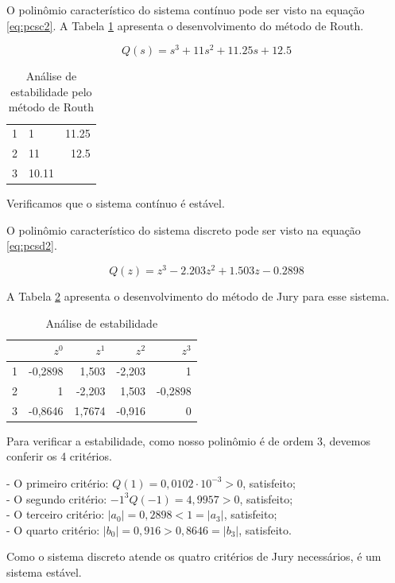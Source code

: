     O polinômio característico do sistema contínuo pode ser visto na equação \ref{eq:pcsc2}. A Tabela 
    \ref{tab:RE2} apresenta o desenvolvimento do método de Routh. 
    
    \begin{equation}
        Q(s) = s^3+11s^2+11.25s+12.5
        \label{eq:pcsc2}
    \end{equation}

    \begin{table}[!ht]
        \centering
        \vspace{0.5cm}
        \caption{Análise de estabilidade pelo método de Routh} 
        \begin{tabular}{r|lr}
            
            1 & 1 & 11.25 \\
            2 & 11 & 12.5 \\
            3 & 10.11\\
        \end{tabular}                
        \label{tab:RE2}
    \end{table}

    Verificamos que o sistema contínuo é estável.

    O polinômio característico do sistema discreto pode ser visto na equação \ref{eq:pcsd2}.

    \begin{equation}
        Q(z) = z^3 - 2.203 z^2 + 1.503 z - 0.2898
        \label{eq:pcsd2}
    \end{equation}

    A Tabela \ref{tab:JE2} apresenta o desenvolvimento do método de Jury para esse sistema.

    \begin{table}[!ht]
        \centering
        \caption{Análise de estabilidade} 
        \begin{tabular}{l| r r r r}
            & $z^0$ & $z^1$ & $z^2$ & $z^3$\\
            \hline
            1 & -0{,}2898 & 1{,}503 & -2{,}203 & 1\\
            2 & 1 & -2{,}203 & 1{,}503 & -0{,}2898\\
            3 & -0{,}8646 & 1{,}7674 & -0{,}916 & 0\\
        \end{tabular}                
        \label{tab:JE2}
    \end{table}

    Para verificar a estabilidade, como nosso polinômio é de ordem 3, devemos conferir os 4 critérios.

    - O primeiro critério: $Q(1)= 0,0102 \cdot 10^{-3} > 0$, satisfeito; \\
    - O segundo critério: $-1^3 Q(-1) = 4,9957 > 0$, satisfeito;\\
    - O terceiro critério: $|a_0| = 0,2898 < 1 = |a_3|$, satisfeito; \\
    - O quarto critério: $|b_0| = 0,916 > 0,8646 = |b_3| $, satisfeito. 
    
    Como o sistema discreto atende os quatro critérios de Jury necessários, é um sistema estável.
    